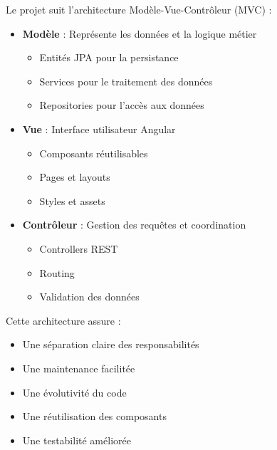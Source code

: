 Le projet suit l'architecture Modèle-Vue-Contrôleur (MVC) :

\begin{itemize}
\item \textbf{Modèle} : Représente les données et la logique métier
  \begin{itemize}
  \item Entités JPA pour la persistance
  \item Services pour le traitement des données
  \item Repositories pour l'accès aux données
  \end{itemize}

\item \textbf{Vue} : Interface utilisateur Angular
  \begin{itemize}
  \item Composants réutilisables
  \item Pages et layouts
  \item Styles et assets
  \end{itemize}

\item \textbf{Contrôleur} : Gestion des requêtes et coordination
  \begin{itemize}
  \item Controllers REST
  \item Routing
  \item Validation des données
  \end{itemize}
\end{itemize}

Cette architecture assure :
\begin{itemize}
\item Une séparation claire des responsabilités
\item Une maintenance facilitée
\item Une évolutivité du code
\item Une réutilisation des composants
\item Une testabilité améliorée
\end{itemize} 